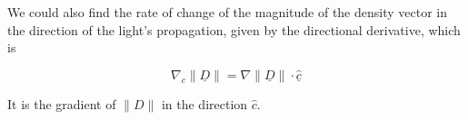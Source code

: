 We could also find the rate of change of the magnitude of the density vector in the direction of the light's propagation, given by the directional derivative, which is

\begin{equation}
	\nabla_c \| \underline{D} \| = \nabla \| \underline{D} \| \cdot \hat{\underline{c}}
\end{equation}

It is the gradient of $\|D\|$ in the direction $\hat{c}$.








